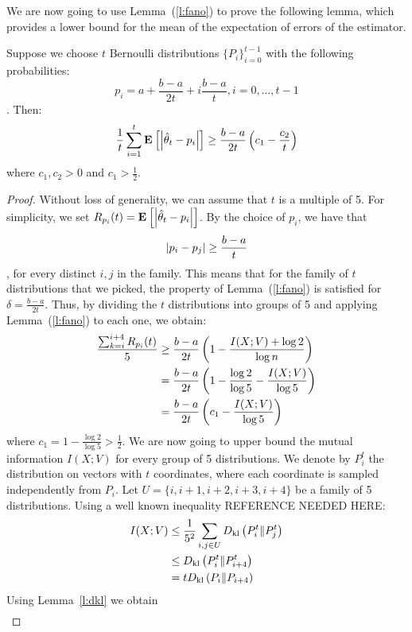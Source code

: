 We are now going to use Lemma~(\ref{l:fano}) to prove the following lemma,
which provides a lower bound for the mean of the expectation of errors
of the estimator.
\begin{lemma}\label{l:fano_application}
  Suppose we choose $t$ Bernoulli distributions $\{P_i\}_{i=0}^{t-1}$
  with the following probabilities:
  \[
    p_i = a+\frac{b-a}{2t} + i \frac{b-a}{t} , i=0, ..., t-1
  \].
  Then:
  $$
  \frac{1}{t} \sum_{i=1}^t \Exp{\lp|\hat{\theta}_t-p_i\rp|}
  \geq \frac{b-a}{2t} \lp(c_1 - \frac{c_2}{t}\rp)
  $$
  where $c_1, c_2 >0$ and $c_1 > \frac{1}{2}$.
\end{lemma}
\begin{proof}
  Without loss of generality, we can assume that $t$ is a multiple of 5.
  For simplicity, we set $R_{p_i}(t) = \Exp{\lp|\hat{\theta}_t-p_i\rp|}$.
  By the choice of $p_i$, we have that $$\left|p_i - p_j\right| \geq \frac{b-a}{t}$$,
  for every distinct $i,j$ in the family.
  This means that for the family of $t$ distributions that we picked, the property
  of Lemma~(\ref{l:fano}) is satisfied for $\delta = \frac{b-a}{2t}$.
  Thus, by dividing the $t$ distributions into groups of 5 and applying
  Lemma~(\ref{l:fano}) to each one, we obtain:
  \begin{align}\label{eq:fano}
    \frac{\sum_{k =i}^{i+4}R_{p_i}(t)}{5}
    &\geq
    \frac{b-a}{2t}\left(1-\frac{I(X;V)+\log 2}{\log n}\right) \nonumber\\
    &=
    \frac{b-a}{2t}\left(1- \frac{\log 2}{\log 5} - \frac{I(X;V)}{\log5}\right) \nonumber\\
    &=
    \frac{b-a}{2t}\left(c_1 - \frac{I(X;V)}{\log5}\right)
  \end{align}
  where $c_1 = 1-\frac{\log2}{\log5} > \frac{1}{2}$.
  We are now going to upper bound the mutual information $I(X;V)$ for every
  group of 5 distributions. We denote by $P_i^t$ the distribution on
  vectors with $t$ coordinates,
  where each coordinate is sampled independently from $P_i$.
  Let $U= \{i,i+1,i+2,i+3,i+4\}$ be a family of 5 distributions.
  Using a well known inequality REFERENCE NEEDED HERE:
  \begin{align*}
    I(X;V)
    &\leq
    \frac{1}{5^2}\sum_{\substack{i,j \in U}} D_{\mathrm{kl}} \left(P_i^t\|P_j^t\right)\\
    &\leq
    D_{\mathrm{kl}} \left(P_i^t\|P_{i+4}^t\right)\\
    &=
    t D_{\mathrm{kl}} \left(P_i\|P_{i+4}\right)\\
  \end{align*}
  Using Lemma~\ref{l:dkl} we obtain 
  \begin{align*}

\end{align*}
\end{proof}
